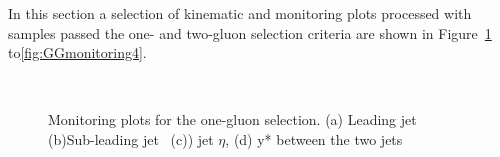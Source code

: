In this section a selection of kinematic and monitoring plots processed with samples passed the one- and two-gluon selection criteria are shown in Figure~\ref{fig:GGmonitoring1} to\ref{fig:GGmonitoring4}. 
\begin{figure}[htb]
 \centering
{}
\\

 \caption{Monitoring plots for %
 the one-gluon selection. (a) Leading jet \pt\, %
 (b)Sub-leading jet \pt\,
 (c)) jet $\eta$,
 (d) y* between the two jets}
 \label{fig:GGmonitoring1}
\end{figure}

